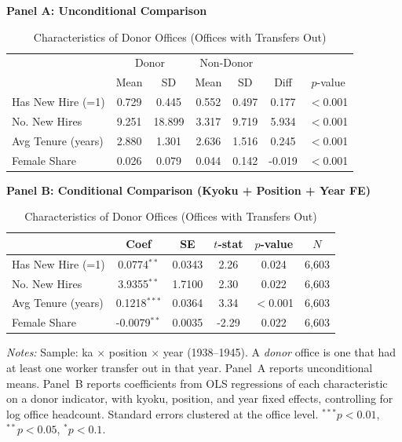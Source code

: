 \begin{table}[htbp]
\centering
\caption{Characteristics of Donor Offices (Offices with Transfers Out)}
\label{tab:donor}
\small
\begin{threeparttable}

\textbf{Panel A: Unconditional Comparison}
\medskip

\begin{tabular}{lcccccc}
\toprule
 & \multicolumn{2}{c}{Donor} & \multicolumn{2}{c}{Non-Donor} & & \\
 & Mean & SD & Mean & SD & Diff & $p$-value \\
\midrule
Has New Hire (=1) & 0.729 & 0.445 & 0.552 & 0.497 & 0.177 & $<$0.001 \\
No. New Hires & 9.251 & 18.899 & 3.317 & 9.719 & 5.934 & $<$0.001 \\
Avg Tenure (years) & 2.880 & 1.301 & 2.636 & 1.516 & 0.245 & $<$0.001 \\
Female Share & 0.026 & 0.079 & 0.044 & 0.142 & -0.019 & $<$0.001 \\
\bottomrule
\end{tabular}

\bigskip

\textbf{Panel B: Conditional Comparison (Kyoku + Position + Year FE)}
\medskip

\begin{tabular}{lccccc}
\toprule
 & Coef & SE & $t$-stat & $p$-value & $N$ \\
\midrule
Has New Hire (=1) & 0.0774$^{**}$ & 0.0343 & 2.26 & 0.024 & 6,603 \\
No. New Hires & 3.9355$^{**}$ & 1.7100 & 2.30 & 0.022 & 6,603 \\
Avg Tenure (years) & 0.1218$^{***}$ & 0.0364 & 3.34 & $<$0.001 & 6,603 \\
Female Share & -0.0079$^{**}$ & 0.0035 & -2.29 & 0.022 & 6,603 \\
\bottomrule
\end{tabular}

\begin{tablenotes}[flushleft]
\footnotesize
\item \textit{Notes:} Sample: ka $\times$ position $\times$ year (1938--1945). A \emph{donor} office is one that had at least one worker transfer out in that year. Panel~A reports unconditional means. Panel~B reports coefficients from OLS regressions of each characteristic on a donor indicator, with kyoku, position, and year fixed effects, controlling for log office headcount. Standard errors clustered at the office level. $^{***}p<0.01$, $^{**}p<0.05$, $^{*}p<0.1$.
\end{tablenotes}
\end{threeparttable}
\end{table}
